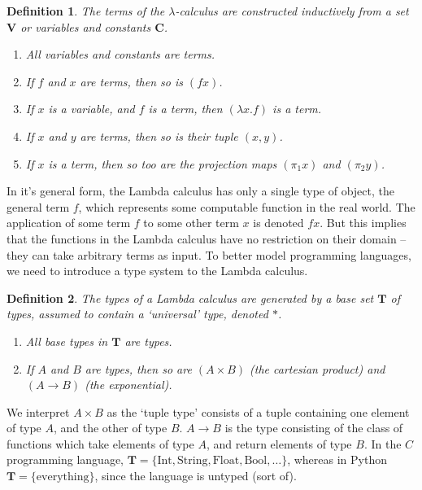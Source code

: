 \documentclass{article}
\theoremstyle{plain}
\newtheorem{definition}{Definition}
\begin{document}
\begin{definition}
    The terms of the $\lambda$-calculus are constructed inductively from a set $\mathbf{V}$ or variables and constants $\mathbf{C}$.
    \begin{enumerate}
        \item All variables and constants are terms.
        \item If $f$ and $x$ are terms, then so is $(fx)$.
        \item If $x$ is a variable, and $f$ is a term, then $(\lambda x.f)$ is a term.
        \item If $x$ and $y$ are terms, then so is their tuple $(x,y)$.
        \item If $x$ is a term, then so too are the projection maps $(\pi_1 x)$ and $(\pi_2 y)$.
    \end{enumerate}
\end{definition}

In it's general form, the Lambda calculus has only a single type of object, the general term $f$, which represents some computable function in the real world. The application of some term $f$ to some other term $x$ is denoted $fx$. But this implies that the functions in the Lambda calculus have no restriction on their domain -- they can take arbitrary terms as input. To better model programming languages, we need to introduce a type system to the Lambda calculus.

\begin{definition}
    The types of a Lambda calculus are generated by a base set $\mathbf{T}$ of types, assumed to contain a `universal' type, denoted $*$.
    \begin{enumerate}
        \item All base types in $\mathbf{T}$ are types.
        \item If $A$ and $B$ are types, then so are $(A \times B)$ (the cartesian product) and $(A \rightarrow B)$ (the exponential).
    \end{enumerate}
\end{definition}

We interpret $A \times B$ as the `tuple type' consists of a tuple containing one element of type $A$, and the other of type $B$. $A \rightarrow B$ is the type consisting of the class of functions which take elements of type $A$, and return elements of type $B$. In the $C$ programming language, $\mathbf{T} = \{ \text{Int}, \text{String}, \text{Float}, \text{Bool}, \dots \}$, whereas in Python $\mathbf{T} = \{ \text{everything} \}$, since the language is untyped (sort of).
\end{document}
